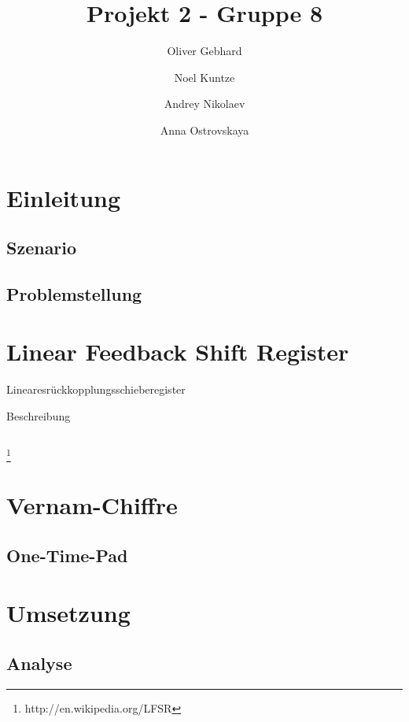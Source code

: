 \documentclass[a4paper,12pt]{article}
\begin{document}
\title{Projekt 2 - Gruppe 8}
\author{ Oliver Gebhard \and Noel Kuntze \and
Andrey Nikolaev \and Anna Ostrovskaya }
\maketitle


\newpage
\tableofcontents

\newpage
\setcounter{tocdepth}{2}

\newpage

\section{Einleitung}

\subsection{Szenario}


\subsection{Problemstellung}

\section{Linear Feedback Shift Register}

Linearesrückkopplungsschieberegister

Beschreibung

\begin{verbatim}

\end{verbatim}

\footnote{http://en.wikipedia.org/LFSR}

\section{Vernam-Chiffre}

\subsection{One-Time-Pad}

\section{Umsetzung}

\subsection{Analyse}
\end{document}
